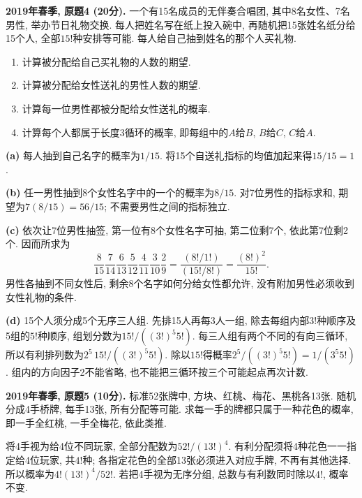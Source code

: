 \begin{exercise}\label{ex:m1-2019s-q4}
\textbf{2019年春季, 原题4 (20分).} 一个有15名成员的无伴奏合唱团, 其中8名女性、7名男性, 举办节日礼物交换. 每人把姓名写在纸上投入碗中, 再随机把15张姓名纸分给15个人, 全部$15!$种安排等可能. 每人给自己抽到姓名的那个人买礼物.
\begin{enumerate}\item[(a)]\label{ex:m1-2019s-q4-a} 计算被分配给自己买礼物的人数的期望.\item[(b)]\label{ex:m1-2019s-q4-b} 计算被分配给女性送礼的男性人数的期望.\item[(c)]\label{ex:m1-2019s-q4-c} 计算每一位男性都被分配给女性送礼的概率.\item[(d)]\label{ex:m1-2019s-q4-d} 计算每个人都属于长度3循环的概率, 即每组中的$A$给$B$, $B$给$C$, $C$给$A$.\end{enumerate}
\end{exercise}
\begin{solution}
\textbf{(a)}\label{sol:m1-2019s-q4-a} 每人抽到自己名字的概率为$1/15$. 将15个自送礼指标的均值加起来得$15/15=1$.

\textbf{(b)}\label{sol:m1-2019s-q4-b} 任一男性抽到8个女性名字中的一个的概率为$8/15$. 对7位男性的指标求和, 期望为$7(8/15)=56/15$; 不需要男性之间的指标独立.

\textbf{(c)}\label{sol:m1-2019s-q4-c} 依次让7位男性抽签, 第一位有8个女性名字可抽, 第二位剩7个, 依此第7位剩2个. 因而所求为
\[
\frac8{15}\frac7{14}\frac6{13}\frac5{12}\frac4{11}\frac3{10}\frac2{9}
=\frac{(8!/1!)}{(15!/8!)}=\frac{(8!)^2}{15!}.
\]
男性各抽到不同女性后, 剩余8个名字如何分给女性都允许, 没有附加男性必须收到女性礼物的条件.

\textbf{(d)}\label{sol:m1-2019s-q4-d} 15个人须分成5个无序三人组. 先排15人再每3人一组, 除去每组内部$3!$种顺序及5组的$5!$种顺序, 组划分数为$15!/((3!)^5 5!)$. 每三人组有两个不同的有向三循环, 所以有利排列数为$2^5\,15!/((3!)^5 5!)$. 除以$15!$得概率$2^5/((3!)^5 5!)=1/(3^5 5!)$. 组内的方向因子2不能省略, 也不能把三循环按三个可能起点再次计数.
\end{solution}

\begin{exercise}\label{ex:m1-2019s-q5}
\textbf{2019年春季, 原题5 (10分).} 标准52张牌中, 方块、红桃、梅花、黑桃各13张. 随机分成4手桥牌, 每手13张, 所有分配等可能. 求每一手的牌都只属于一种花色的概率, 即一手全红桃, 一手全梅花, 依此类推.
\end{exercise}
\begin{solution}
\label{sol:m1-2019s-q5}
将4手视为给4位不同玩家, 全部分配数为$52!/(13!)^4$. 有利分配须将4种花色一一指定给4位玩家, 共$4!$种; 各指定花色的全部13张必须进入对应手牌, 不再有其他选择. 所以概率为$4!(13!)^4/52!$. 若把4手视为无序分组, 总数与有利数同时除以$4!$, 概率不变.
\end{solution}

